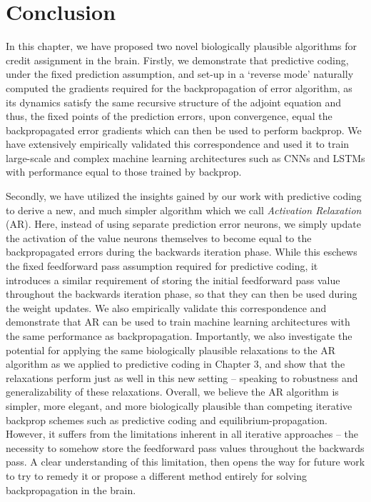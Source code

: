 \section{Conclusion}

In this chapter, we have proposed two novel biologically plausible algorithms for credit assignment in the brain. Firstly, we demonstrate that predictive coding, under the fixed prediction assumption, and set-up in a `reverse mode' naturally computed the gradients required for the backpropagation of error algorithm, as its dynamics satisfy the same recursive structure of the adjoint equation and thus, the fixed points of the prediction errors, upon convergence, equal the backpropagated error gradients which can then be used to perform backprop. We have extensively empirically validated this correspondence and used it to train large-scale and complex machine learning architectures such as CNNs and LSTMs with performance equal to those trained by backprop. 

Secondly, we have utilized the insights gained by our work with predictive coding to derive a new, and much simpler algorithm which we call \emph{Activation Relaxation} (AR). Here, instead of using separate prediction error neurons, we simply update the activation of the value neurons themselves to become equal to the backpropagated errors during the backwards iteration phase. While this eschews the fixed feedforward pass assumption required for predictive coding, it introduces a similar requirement of storing the initial feedforward pass value throughout the backwards iteration phase, so that they can then be used during the weight updates. We also empirically validate this correspondence and demonstrate that AR can be used to train machine learning architectures with the same performance as backpropagation. Importantly, we also investigate the potential for applying the same biologically plausible relaxations to the AR algorithm as we applied to predictive coding in Chapter 3, and show that the relaxations perform just as well in this new setting -- speaking to robustness and generalizability of these relaxations. Overall, we believe the AR algorithm is simpler, more elegant, and more biologically plausible than competing iterative backprop schemes such as predictive coding and equilibrium-propagation. However, it suffers from the limitations inherent in all iterative approaches -- the necessity to somehow store the feedforward pass values throughout the backwards pass. A clear understanding of this limitation, then opens the way for future work to try to remedy it or propose a different method entirely for solving backpropagation in the brain.

